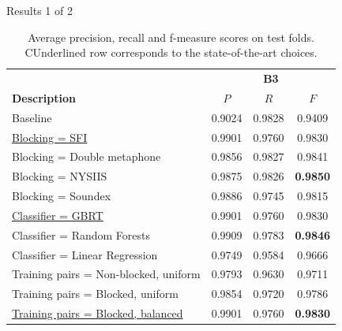 \documentclass{beamer}
\begin{document}

\begin{frame}{Results 1 of 2}

\begin{table}
\caption{Average precision, recall and f-measure scores on test folds. CUnderlined row corresponds to the state-of-the-art choices.}
\centering
\begin{tabular}{|l|c c c |}
  \hline
                       & \multicolumn{3}{|c|}{\textbf{B3}}\\
  \textbf{Description} & $P$ & $R$ & $F$ \\
  \hline
  \hline
Baseline & 0.9024 & 0.9828 & 0.9409  \\
\hline
\underline{Blocking = SFI} & 0.9901 & 0.9760 & 0.9830  \\
Blocking = Double metaphone & 0.9856 & 0.9827 & 0.9841  \\
Blocking = NYSIIS & 0.9875 & 0.9826 & \textbf{0.9850}   \\
Blocking = Soundex & 0.9886 & 0.9745 & 0.9815  \\
\hline
\underline{Classifier = GBRT} & 0.9901 & 0.9760 & 0.9830   \\
Classifier = Random Forests & 0.9909 & 0.9783 & \textbf{0.9846}  \\
Classifier = Linear Regression & 0.9749 & 0.9584 & 0.9666 \\
\hline
Training pairs = Non-blocked, uniform & 0.9793 & 0.9630 & 0.9711   \\
Training pairs = Blocked, uniform & 0.9854 & 0.9720 & 0.9786   \\
\underline{Training pairs = Blocked, balanced} & 0.9901 & 0.9760 & \textbf{0.9830}  \\
\hline

\end{tabular}
\end{table}

\end{frame}

\end{document}
